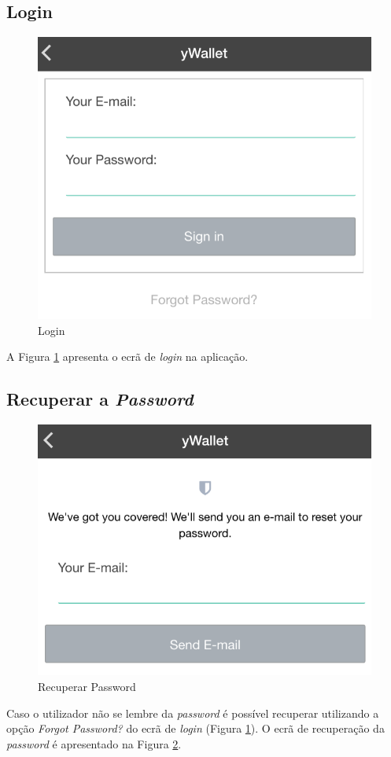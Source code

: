 \subsection{Login}
  \begin{figure}[H]
    \begin{center}
      \includegraphics[width=0.5
      \textwidth]{authentication/login.png}
    \end{center}
    \caption{Login}
    \label{fig:1_2}
  \end{figure}

A Figura \ref{fig:1_2} apresenta o ecrã de \textit{login} na aplicação.

\subsection{Recuperar a \textit{Password}}
  \begin{figure}[H]
    \begin{center}
      \includegraphics[width=0.5
      \textwidth]{authentication/forget.png}
    \end{center}
    \caption{Recuperar Password}
    \label{fig:1_3}
  \end{figure}

Caso o utilizador não se lembre da \textit{password} é possível recuperar utilizando a opção \textit{Forgot Password?} do ecrã de \textit{login} (Figura \ref{fig:1_2}). O ecrã de recuperação da \textit{password} é apresentado na Figura \ref{fig:1_3}.